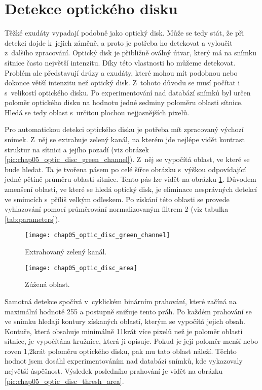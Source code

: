 \section{Detekce optického disku}
Těžké exudáty vypadají podobně jako optický disk. Může se tedy stát, že při detekci dojde k~jejich záměně, a proto je potřeba ho detekovat a vyloučit z~dalšího zpracování. Optický disk je přibližně oválný útvar, který má na snímku sítnice často největší intenzitu. Díky této vlastnosti ho můžeme detekovat. Problém ale představují drúzy a exudáty, které mohou mít podobnou nebo dokonce větší intenzitu než optický disk. Z~tohoto důvodu se musí počítat i s~velikostí optického disku. Po experimentování nad databází snímků byl určen poloměr optického disku na hodnotu jedné sedminy poloměru oblasti sítnice. Hledá se tedy oblast s~určitou plochou nejjasnějších pixelů. 

Pro automatickou detekci optického disku je potřeba mít zpracovaný výchozí snímek. Z~něj se extrahuje zelený kanál, na kterém jde nejlépe vidět kontrast struktur na sítnici a jejího pozadí (viz obrázek \ref{pic:chap05_optic_disc_green_channel}). Z~něj se vypočítá oblast, ve které se bude hledat. Ta je tvořena pásem po celé šířce obrázku s~výškou odpovídající jedné pětině průměru oblasti sítnice. Tento pás lze vidět na obrázku \ref{pic:chap05_optic_disc_area}. Důvodem zmenšení oblasti, ve které se hledá optický disk, je eliminace nesprávných detekcí ve smímcích s~příliš velkým odleskem. Po získání této oblasti se provede vyhlazování pomocí průměrování normalizovaným filtrem 2 (viz tabulka \ref{tab:parameters}).

\begin{figure}[h]
  \begin{minipage}[c]{0.47\textwidth}
    \texttt{[image: chap05\_optic\_disc\_green\_channel]}
    \caption{Extrahovaný zelený kanál.}
    \label{pic:chap05_optic_disc_green_channel}
  \end{minipage}
  \hfill
  \begin{minipage}[c]{0.47\textwidth}
    \texttt{[image: chap05\_optic\_disc\_area]}
    \caption{Zúžená oblast.}
    \label{pic:chap05_optic_disc_area}
  \end{minipage}
\end{figure}

Samotná detekce spočívá v~cyklickém binárním prahování, které začíná na maximální hodnotě 255 a postupně snižuje tento práh. Po každém prahování se ve snímku hledají kontury získaných oblastí, kterým se vypočítá jejich obsah. Kontuře, která obsahuje minimálně 11krát více pixelů než je poloměr oblasti sítnice, je vypočítána kružnice, která ji opisuje. Pokud je její poloměr menší nebo roven 1,2krát poloměru optického disku, pak mu tato oblast náleží. Těchto hodnot jsem dosáhl experimentováním nad databází snímků, kde vykazovaly největší úspěšnost. Výsledek posledního prahování je vidět na obrázku \ref{pic:chap05_optic_disc_thresh_area}.

